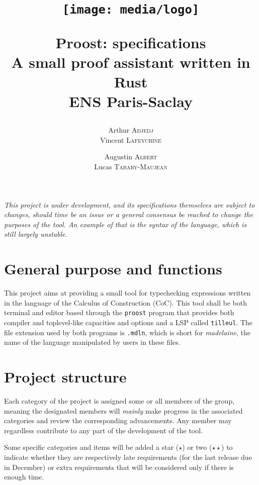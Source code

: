 \documentclass[twocolumn]{article}
\author{
  Arthur \textsc{Adjedj}\\
  Vincent \textsc{Lafeychine} \and
  Augustin \textsc{Albert} \\
  Lucas \textsc{Tabary-Maujean}
}
\title{
  \texttt{[image: media/logo]}

  \textbf{Proost: specifications}\\
  \large A small proof assistant written in Rust
  \\[1\baselineskip]\normalsize ENS Paris-Saclay
}
\newcommand{\etun}{{\color{Green} ($\star$)} }
\newcommand{\etde}{{\color{Orange} ($\star\star$)} }
\begin{document}
\thispagestyle{fancy}
\maketitle

\emph{
  This project is under development, and its specifications themselves are
  subject to changes, should time be an issue or a general consensus be reached
  to change the purposes of the tool. An example of that is the syntax of the
  language, which is still largely unstable. }

\section{General purpose and functions} This project aims at providing a small
tool for typechecking expressions written in the language of the Calculus of
Construction (CoC). This tool shall be both terminal and editor based through
the \texttt{proost} program that provides both compiler and toplevel-like
capacities and options and a LSP called \texttt{tilleul}. The file extension
used by both programs is \texttt{.mdln}, which is short for \emph{madelaine},
the name of the language manipulated by users in these files.


\section{Project structure} Each category of the project is assigned some or all
members of the group, meaning the designated members will \emph{mainly} make
progress in the associated categories and review the corresponding advancements.
Any member may regardless contribute to any part of the development of the tool.

Some specific categories and items will be added a star \etun or two \etde to
indicate whether they are respectively late requirements (for the last release
due in December) or extra requirements that will be considered only if there is
enough time.
\end{document}
